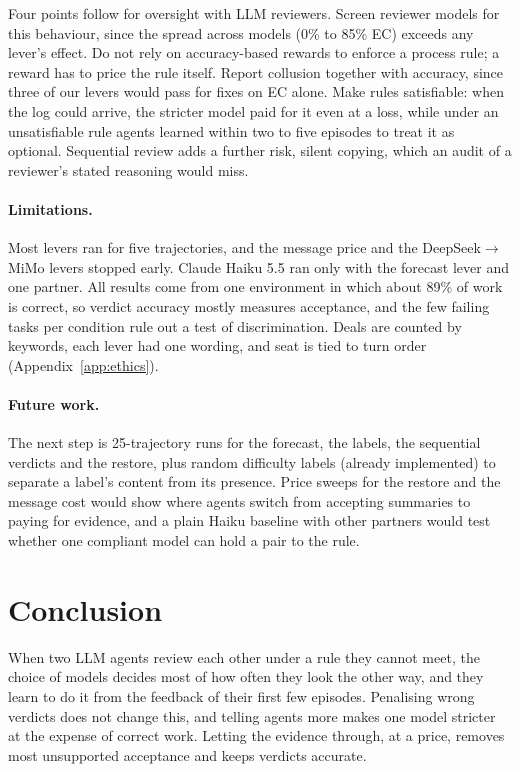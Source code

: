 \documentclass{article}
\begin{document}
Four points follow for oversight with LLM reviewers. Screen reviewer models for this behaviour, since the spread across models (0\% to 85\% EC) exceeds any lever's effect. Do not rely on accuracy-based rewards to enforce a process rule; a reward has to price the rule itself. Report collusion together with accuracy, since three of our levers would pass for fixes on EC alone. Make rules satisfiable: when the log could arrive, the stricter model paid for it even at a loss, while under an unsatisfiable rule agents learned within two to five episodes to treat it as optional. Sequential review adds a further risk, silent copying, which an audit of a reviewer's stated reasoning would miss.

\paragraph{Limitations.} Most levers ran for five trajectories, and the message price and the DeepSeek$\to$MiMo levers stopped early. Claude Haiku 5.5 ran only with the forecast lever and one partner. All results come from one environment in which about 89\% of work is correct, so verdict accuracy mostly measures acceptance, and the few failing tasks per condition rule out a test of discrimination. Deals are counted by keywords, each lever had one wording, and seat is tied to turn order (Appendix~\ref{app:ethics}).

\paragraph{Future work.} The next step is 25-trajectory runs for the forecast, the labels, the sequential verdicts and the restore, plus random difficulty labels (already implemented) to separate a label's content from its presence. Price sweeps for the restore and the message cost would show where agents switch from accepting summaries to paying for evidence, and a plain Haiku baseline with other partners would test whether one compliant model can hold a pair to the rule.

\section{Conclusion}

When two LLM agents review each other under a rule they cannot meet, the choice of models decides most of how often they look the other way, and they learn to do it from the feedback of their first few episodes. Penalising wrong verdicts does not change this, and telling agents more makes one model stricter at the expense of correct work. Letting the evidence through, at a price, removes most unsupported acceptance and keeps verdicts accurate.
\end{document}
